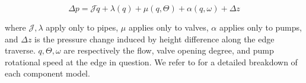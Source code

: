 \begin{equation}\label{eq:GeneralEdgeModel}
	\Delta p = \mathcal{J}\dot{q} + \lambda(q) + \mu(q,\Theta) + \alpha(q,\omega) + \Delta z
\end{equation}

where $\mathcal{J},\lambda$ apply only to pipes, $\mu$ applies only to valves, $\alpha$ applies only to pumps, and $\Delta z$ is the pressure change induced by height difference along the edge traverse. $q,\Theta,\omega$ are respectively the flow, valve opening degree, and pump rotational speed at the edge in question. We refer to \cite{Swamee2008,Jensen} for a detailed breakdown of each component model.

%
%
%


